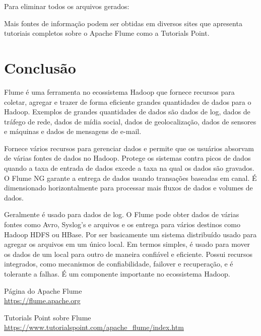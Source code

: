 \documentclass[a4paper,11pt]{article}
\begin{document}
Para eliminar todos os arquivos gerados: \\

Mais fontes de informação podem ser obtidas em diversos sites que apresenta tutoriais completos sobre o Apache Flume como a Tutorials Point\cite{tutorialspoint}.
	
\section{Conclusão}
Flume é uma ferramenta no ecossistema Hadoop que fornece recursos para coletar, agregar e trazer de forma eficiente grandes quantidades de dados para o Hadoop. Exemplos de grandes quantidades de dados são dados de log, dados de tráfego de rede, dados de mídia social, dados de geolocalização, dados de sensores e máquinas e dados de mensagens de e-mail. 

Fornece vários recursos para gerenciar dados e permite que os usuários absorvam de várias fontes de dados no Hadoop. Protege os sistemas contra picos de dados quando a taxa de entrada de dados excede a taxa na qual os dados são gravados. O Flume NG garante a entrega de dados usando transações baseadas em canal. É dimensionado horizontalmente para processar mais fluxos de dados e volumes de dados.

Geralmente é usado para dados de log. O Flume pode obter dados de várias fontes como Avro, Syslog’s e arquivos e os entrega para vários destinos como Hadoop HDFS ou HBase. Por ser basicamente um sistema distribuído usado para agregar os arquivos em um único local. Em termos simples, é usado para mover os dados de um local para outro de maneira confiável e eficiente. Possui recursos integrados, como mecanismos de confiabilidade, failover e recuperação, e é tolerante a falhas. É um componente importante no ecossistema Hadoop.



\begin{thebibliography}{4}
	Página do Apache Flume \\
	\url{https://flume.apache.org}

	Tutorials Point sobre Flume \\
	\url{https://www.tutorialspoint.com/apache_flume/index.htm}
	
	
\end{thebibliography}
\end{document}
